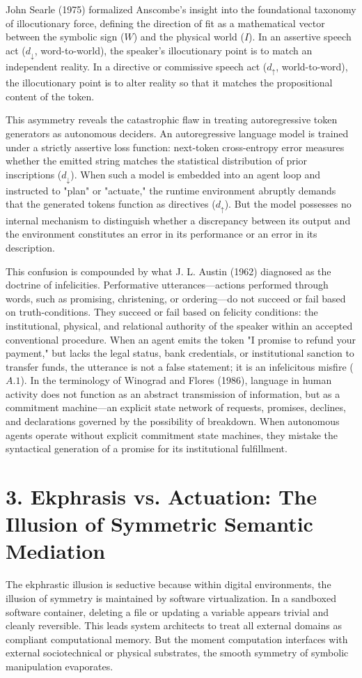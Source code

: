 \documentclass[11pt,twocolumn]{article}
\begin{document}
John Searle (1975) formalized Anscombe's insight into the foundational taxonomy of illocutionary force, defining the direction of fit as a mathematical vector between the symbolic sign ($W$) and the physical world ($I$). In an assertive speech act ($d_\downarrow$, word-to-world), the speaker's illocutionary point is to match an independent reality. In a directive or commissive speech act ($d_\uparrow$, world-to-word), the illocutionary point is to alter reality so that it matches the propositional content of the token. 

This asymmetry reveals the catastrophic flaw in treating autoregressive token generators as autonomous deciders. An autoregressive language model is trained under a strictly assertive loss function: next-token cross-entropy error measures whether the emitted string matches the statistical distribution of prior inscriptions ($d_\downarrow$). When such a model is embedded into an agent loop and instructed to "plan" or "actuate," the runtime environment abruptly demands that the generated tokens function as directives ($d_\uparrow$). But the model possesses no internal mechanism to distinguish whether a discrepancy between its output and the environment constitutes an error in its performance or an error in its description.

This confusion is compounded by what J. L. Austin (1962) diagnosed as the doctrine of infelicities. Performative utterances—actions performed through words, such as promising, christening, or ordering—do not succeed or fail based on truth-conditions. They succeed or fail based on felicity conditions: the institutional, physical, and relational authority of the speaker within an accepted conventional procedure. When an agent emits the token "I promise to refund your payment," but lacks the legal status, bank credentials, or institutional sanction to transfer funds, the utterance is not a false statement; it is an infelicitous misfire ($A.1$). In the terminology of Winograd and Flores (1986), language in human activity does not function as an abstract transmission of information, but as a commitment machine—an explicit state network of requests, promises, declines, and declarations governed by the possibility of breakdown. When autonomous agents operate without explicit commitment state machines, they mistake the syntactical generation of a promise for its institutional fulfillment.

\section*{3. Ekphrasis vs. Actuation: The Illusion of Symmetric Semantic Mediation}
The ekphrastic illusion is seductive because within digital environments, the illusion of symmetry is maintained by software virtualization. In a sandboxed software container, deleting a file or updating a variable appears trivial and cleanly reversible. This leads system architects to treat all external domains as compliant computational memory. But the moment computation interfaces with external sociotechnical or physical substrates, the smooth symmetry of symbolic manipulation evaporates.
\end{document}
